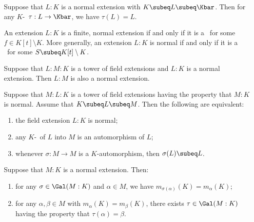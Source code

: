 \documentclass{article}
\begin{document}
  \begin{tproposition}
    Suppose that \( L:K \) is a normal extension with \( K\subeq L\subeq \Kbar \).
    Then for any \( K \)-\homo~\( \tau:L\to \Kbar \), we have \( \tau(L) = L \).
  \end{tproposition}

  \begin{tproposition}
    An extension \( L:K \) is a finite, normal extension if and only if it is a \sfe~for some \( f\in K[t]\setminus K \).
    More generally, an extension \( L:K \) is normal if and only if it is a \sfe~for some \( S\subeq K[t]\setminus K \).
  \end{tproposition}

  \begin{tproposition}
    Suppose that \( L:M:K \) is a tower of field extensions and \( L:K \) is a normal extension.
    Then \( L:M \) is also a normal extension.
  \end{tproposition}

  \begin{ttheorem}
    Suppose that \( M:L:K \) is a tower of field extensions having the property that \( M:K \) is normal.
    Assume that \( K\subeq L\subeq M \).
    Then the following are equivalent: \begin{enumerate}[label=(\roman*)]
      \item the field extension \( L:K \) is normal;
      \item any \( K \)-\homo~of \( L \) into \( M \) is an automorphism of \( L \);
      \item whenever \( \sigma:M\to M \) is a \( K \)-automorphism, then \( \sigma(L)\subeq L \).
    \end{enumerate}
  \end{ttheorem}

  \begin{tproposition}
    Suppose that \( M:K \) is a normal extension.
    Then: \begin{enumerate}[label=(\alph*)]
      \item for any \( \sigma\in\Gal(M:K) \) and \( \alpha\in M \), we have \( m_{\sigma(\alpha)}(K)=m_\alpha(K) \);
      \item for any \( \alpha,\beta\in M \) with \( m_\alpha(K)=m_\beta(K) \), there exists \( \tau\in\Gal(M:K) \) having the property that \( \tau(\alpha)=\beta \).
    \end{enumerate}
  \end{tproposition}
\end{document}
